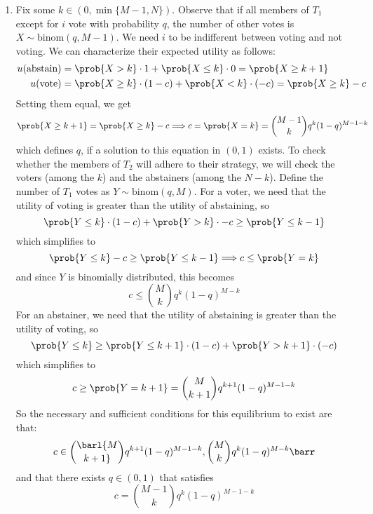 \documentclass[10pt]{article}
\begin{document}
\begin{enumerate}
	\item Fix some $k \in (0,\min\{M-1,N\})$. Observe that if all members of $T_1$ except for $i$ vote with probability $q$, the number of other votes is $X \sim \text{binom}(q,M-1)$. We need $i$ to be indifferent between voting and not voting. We can characterize their expected utility as follows: \begin{align*} u(\text{abstain}) &= \prob\{X > k\} \cdot 1 + \prob\{X \le k\} \cdot 0 = \prob\{X \ge k+1\} \\ u(\text{vote}) &= \prob\{X \ge k\} \cdot (1-c) + \prob\{X < k\}\cdot(-c) = \prob\{X \ge k\} - c \end{align*}Setting them equal, we get \[\prob\{X \ge k+1\} = \prob\{X \ge k\} - c  \Longrightarrow c = \prob\{X = k\} = {M-1 \choose k}q^k(1-q)^{M-1-k}\]which defines $q$, if a solution to this equation in $(0,1)$ exists. To check whether the members of $T_2$ will adhere to their strategy, we will check the voters (among the $k$) and the abstainers (among the $N-k$). Define the number of $T_1$ votes as $Y \sim \text{binom}(q,M)$. For a voter, we need that the utility of voting is greater than the utility of abstaining, so\[\prob\{Y \le k\} \cdot (1-c) + \prob\{Y > k\} \cdot -c \ge \prob\{Y \le k-1\}\]which simplifies to\[\prob\{Y \le k\} - c\ge \prob\{Y \le k-1\} \Longrightarrow c \le \prob\{Y = k\}\]and since $Y$ is binomially distributed, this becomes \[c \le {M \choose k} q^k(1-q)^{M-k}\]For an abstainer, we need that the utility of abstaining is greater than the utility of voting, so \[\prob\{Y \le k\} \ge \prob\{Y\le k+1\}\cdot(1-c) + \prob\{Y > k+1\}\cdot(-c)\]which simplifies to \[c \ge \prob\{Y = k+1\} = {M \choose k+1} q^{k+1}(1-q)^{M - 1 - k}\]So the necessary and sufficient conditions for this equilibrium to exist are that:\[c \in \barl {M \choose k+1} q^{k+1}(1-q)^{M - 1 - k},{M \choose k} q^k(1-q)^{M-k}\barr\] and that there exists $q\in (0,1)$ that satisfies \[c = {M-1 \choose k}q^k(1-q)^{M-1-k}\]

\end{enumerate}
\end{document}
